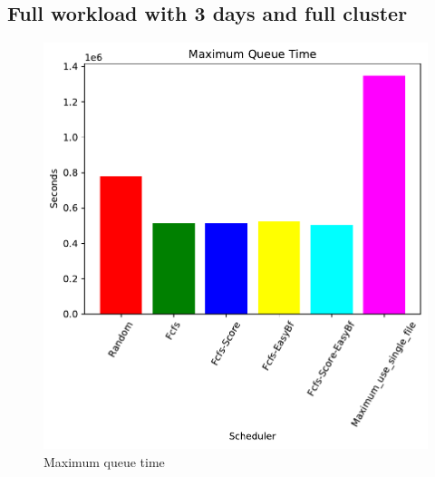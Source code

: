 \documentclass[a4paper]{article}
\begin{document}
	\subsection{Full workload with 3 days and full cluster}
	\begin{figure}[H]
	\begin{minipage}[b]{0.5\linewidth}\centering\includegraphics[width=1\linewidth]{MBSS/plot/2022-03-16_Maximum_queue_time450_128_32_256_4_1024.pdf}\caption{Maximum queue time}\vspace{4ex}\end{minipage}

\end{figure}
\end{document}
